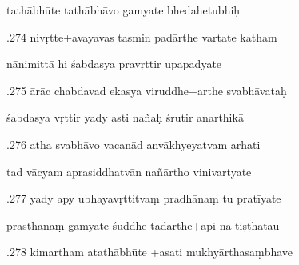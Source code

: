 \documentclass[article,12pt,a4paper]{memoir}%
\newcounter{parCount}
\begin{document}
	  
	  \pstart \leavevmode%
	tathābhūte tathābhāvo gamyate bhedahetubhiḥ 
	{}
	\pend%
      

	  
	  \pstart {}.274 nivṛtte+avayavas tasmin padārthe vartate katham 
	{}
	\pend%
      

	  
	  \pstart \leavevmode%
	nānimittā hi śabdasya pravṛttir upapadyate 
	{}
	\pend%
      

	  
	  \pstart {}.275 ārāc chabdavad ekasya viruddhe+arthe svabhāvataḥ 
	{}
	\pend%
      

	  
	  \pstart \leavevmode%
	śabdasya vṛttir yady asti nañaḥ śrutir anarthikā 
	{}
	\pend%
      

	  
	  \pstart {}.276 atha svabhāvo vacanād anvākhyeyatvam arhati 
	{}
	\pend%
      

	  
	  \pstart \leavevmode%
	tad vācyam aprasiddhatvān nañārtho vinivartyate 
	{}
	\pend%
      

	  
	  \pstart {}.277 yady apy ubhayavṛttitvaṃ pradhānaṃ tu pratīyate 
	{}
	\pend%
      

	  
	  \pstart \leavevmode%
	prasthānaṃ gamyate śuddhe tadarthe+api na tiṣṭhatau 
	{}
	\pend%
      

	  
	  \pstart {}.278 kimartham atathābhūte +asati mukhyārthasaṃbhave 
	{}
	\pend%
      
\end{document}
